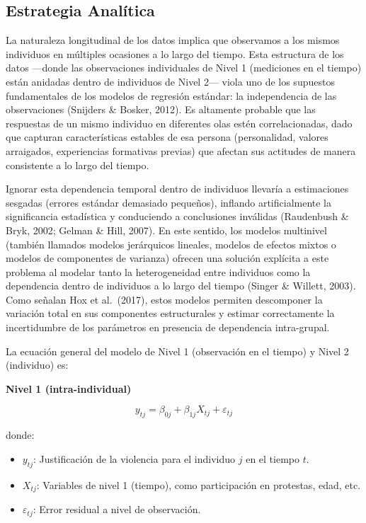 \documentclass[
  13pt,
]{article}
\providecommand{\tightlist}{%
  \setlength{\itemsep}{0pt}\setlength{\parskip}{0pt}}
\begin{document}
\subsection{Estrategia Analítica}\label{estrategia-analuxedtica}

La naturaleza longitudinal de los datos implica que observamos a los
mismos individuos en múltiples ocasiones a lo largo del tiempo. Esta
estructura de los datos ---donde las observaciones individuales de Nivel
1 (mediciones en el tiempo) están anidadas dentro de individuos de Nivel
2--- viola uno de los supuestos fundamentales de los modelos de
regresión estándar: la independencia de las observaciones (Snijders \&
Bosker, 2012). Es altamente probable que las respuestas de un mismo
individuo en diferentes olas estén correlacionadas, dado que capturan
características estables de esa persona (personalidad, valores
arraigados, experiencias formativas previas) que afectan sus actitudes
de manera consistente a lo largo del tiempo.

Ignorar esta dependencia temporal dentro de individuos llevaría a
estimaciones sesgadas (errores estándar demasiado pequeños), inflando
artificialmente la significancia estadística y conduciendo a
conclusiones inválidas (Raudenbush \& Bryk, 2002; Gelman \& Hill, 2007).
En este sentido, los modelos multinivel (también llamados modelos
jerárquicos lineales, modelos de efectos mixtos o modelos de componentes
de varianza) ofrecen una solución explícita a este problema al modelar
tanto la heterogeneidad entre individuos como la dependencia dentro de
individuos a lo largo del tiempo (Singer \& Willett, 2003). Como señalan
Hox et al.~(2017), estos modelos permiten descomponer la variación total
en sus componentes estructurales y estimar correctamente la
incertidumbre de los parámetros en presencia de dependencia
intra-grupal.

La ecuación general del modelo de Nivel 1 (observación en el tiempo) y
Nivel 2 (individuo) es:

\textbf{Nivel 1 (intra-individual)}

\[y_{tj} = \beta_{0j} + \beta_{1j} X_{tj} + \varepsilon_{tj}\]

donde:

\begin{itemize}
\tightlist
\item
  \(y_{tj}\): Justificación de la violencia para el individuo \(j\) en
  el tiempo \(t\).
\item
  \(X_{tj}\): Variables de nivel 1 (tiempo), como participación en
  protestas, edad, etc.
\item
  \(\varepsilon_{tj}\): Error residual a nivel de observación.
\end{itemize}
\end{document}
